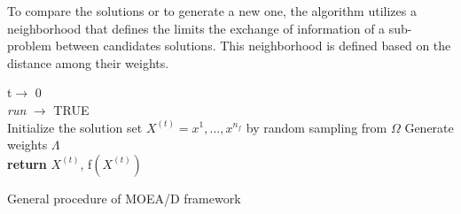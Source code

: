 To compare the solutions or to generate a new one, the algorithm utilizes a neighborhood that defines the limits the exchange of information of a sub-problem between candidates solutions. This neighborhood is defined based on the distance among their weights.



\IncMargin{1em}
\begin{algorithm}
\LinesNumbered
	t$\rightarrow$ 0\\
	\textit{run} $\rightarrow$ TRUE\\
	Initialize the solution set $ X^{(t)} =  {x^1, ..., x^{n_{f}}}$ by random sampling from $\Omega$
	Generate weights $\Lambda$\\
	\textbf{return} 	$X^{(t)}$, f$(X^{(t)})$
	\caption{General procedure of MOEA/D framework}
	\label{algo-moead}
\end{algorithm}\DecMargin{1em}


